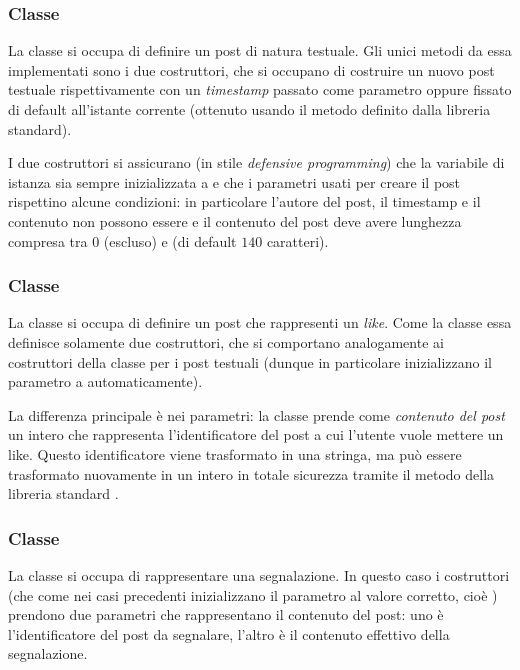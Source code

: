 \subsubsection*{Classe }
La classe  si occupa di definire un post di natura testuale. Gli unici metodi da essa implementati sono i due costruttori, che si occupano di costruire un nuovo post testuale rispettivamente con un \emph{timestamp} passato come parametro oppure fissato di default all'istante corrente (ottenuto usando il metodo  definito dalla libreria standard).

I due costruttori si assicurano (in stile \emph{defensive programming}) che la variabile di istanza  sia sempre inizializzata a  e che i parametri usati per creare il post rispettino alcune condizioni: in particolare l'autore del post, il timestamp e il contenuto non possono essere  e il contenuto del post deve avere lunghezza compresa tra $0$ (escluso) e  (di default $140$ caratteri).

\subsubsection*{Classe }
La classe  si occupa di definire un post che rappresenti un \emph{like}. Come la classe  essa definisce solamente due costruttori, che si comportano analogamente ai costruttori della classe per i post testuali (dunque in particolare inizializzano il parametro  a  automaticamente). 

La differenza principale è nei parametri: la classe  prende come \emph{contenuto del post} un intero che rappresenta l'identificatore del post a cui l'utente vuole mettere un like. Questo identificatore viene trasformato in una stringa, ma può essere trasformato nuovamente in un intero in totale sicurezza tramite il metodo della libreria standard .

\subsubsection*{Classe }
La classe  si occupa di rappresentare una segnalazione. In questo caso i costruttori (che come nei casi precedenti inizializzano il parametro  al valore corretto, cioè ) prendono due parametri che rappresentano il contenuto del post: uno è l'identificatore del post da segnalare, l'altro è il contenuto effettivo della segnalazione. 

